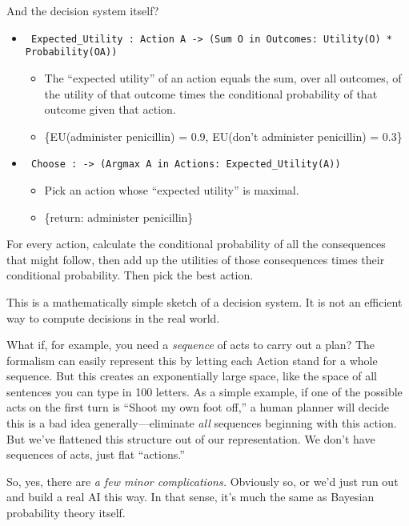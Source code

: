 {
 And the decision system itself?}

\begin{itemize}
\item \texttt{ Expected\_Utility : Action A -{\textgreater}\newline
  (Sum O in Outcomes: Utility(O) * Probability(O{\textbar}A))}
  \begin{itemize}
    \item  The ``expected utility'' of an action
equals the sum, over all outcomes, of the utility of that outcome times
the conditional probability of that outcome given that action.
\item \{EU(administer penicillin) = 0.9,
EU(don't administer penicillin) =
0.3\}
  \end{itemize}

\item \texttt{ Choose :\newline
  -{\textgreater} (Argmax A in Actions: Expected\_Utility(A))}
  \begin{itemize}
  \item  Pick an action whose ``expected utility'' is maximal.
  \item \{return: administer penicillin\}
  \end{itemize}
\end{itemize}

{
 For every action, calculate the conditional probability of all the
consequences that might follow, then add up the utilities of those
consequences times their conditional probability. Then pick the best
action.}

{
 This is a mathematically simple sketch of a decision system. It is
not an efficient way to compute decisions in the real world.}

{
 What if, for example, you need a \textit{sequence} of acts to
carry out a plan? The formalism can easily represent this by letting
each Action stand for a whole sequence. But this creates an
exponentially large space, like the space of all sentences you can type
in 100 letters. As a simple example, if one of the possible acts on the
first turn is ``Shoot my own foot
off,'' a human planner will decide this is a bad idea
generally---eliminate \textit{all} sequences beginning with this
action. But we've flattened this structure out of our
representation. We don't have sequences of acts, just
flat ``actions.''}

{
 So, yes, there are \textit{a few minor complications.} Obviously
so, or we'd just run out and build a real AI this way.
In that sense, it's much the same as Bayesian
probability theory itself.}

